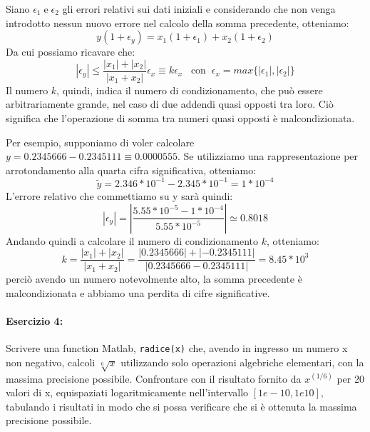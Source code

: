 \documentclass[12pt]{article}
\begin{document}
Siano \(\epsilon_1 \;\text{e}\; \epsilon_2\) gli errori relativi sui dati iniziali e considerando che non venga introdotto nessun nuovo errore nel calcolo della somma precedente, otteniamo:
$$ y(1+\epsilon_y)=x_1(1+\epsilon_1)+x_2(1+\epsilon_2)$$
Da cui possiamo ricavare che:
$$ |\epsilon_y|\leq \frac{|x_1|+|x_2|}{|x_1+x_2|}\epsilon_x\equiv k\epsilon_x \;\;\;\text{con}\;\; \epsilon_x = max\{|\epsilon_1|,|\epsilon_2|\} $$
Il numero \(k\), quindi, indica il numero di condizionamento, che può essere arbitrariamente grande, nel caso di due addendi quasi opposti tra loro. 
Ciò significa che l'operazione di somma tra numeri quasi opposti è malcondizionata.

Per esempio, supponiamo di voler calcolare \(y=0.2345666-0.2345111\equiv 0.0000555\). 
Se utilizziamo una rappresentazione per arrotondamento alla quarta cifra significativa, otteniamo:
$$\tilde{y}=2.346*10^{-1}-2.345*10^{-1} = 1*10^{-4}$$
L'errore relativo che commettiamo su y sarà quindi:
$$|\epsilon_y| = |\frac{5.55*10^{-5}-1*10^{-4}}{5.55*10^{-5}}|\simeq 0.8018$$
Andando quindi a calcolare il numero di condizionamento \(k\), otteniamo:
$$ k=\frac{|x_1|+|x_2|}{|x_1+x_2|}=\frac{|0.2345666|+|-0.2345111|}{|0.2345666-0.2345111|}=8.45*10^3$$
perciò avendo un numero notevolmente alto, la somma precedente è malcondizionata e abbiamo una perdita di cifre significative. 
\paragraph{Esercizio 4:}Scrivere una function Matlab, \texttt{radice(x)} che, avendo in ingresso un numero x non negativo, 
calcoli \(\sqrt[6]{x}\) utilizzando solo operazioni algebriche elementari, con la massima precisione possibile. Confrontare con il risultato fornito da 
\(x^{(1/6)}\) per 20 valori di x, equispaziati logaritmicamente nell’intervallo \([1e-10,1e10]\), tabulando i risultati in modo che si possa verificare che si è ottenuta la massima precisione possibile.
\end{document}
